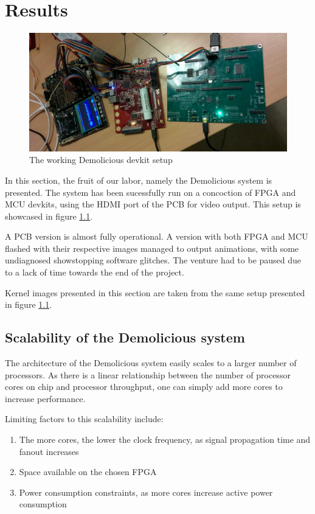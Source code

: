 \documentclass[../main/report.tex]{subfiles}
\begin{document}
\chapter{Results}

\begin{figure}[H]
	\centering
	\includegraphics[width=\textwidth]{../results/diagrams/frankenlicious.jpeg}
	\caption{The working Demolicious devkit setup}
	\label{fig:frankenlicious}
\end{figure}

In this section, the fruit of our labor, namely the Demolicious system is presented.
The system has been sucessfully run on a concoction of FPGA and MCU devkits, using the HDMI port of the PCB for video output.
This setup is showcased in figure \ref{fig:frankenlicious}.

A PCB version is almost fully operational.
A version with both FPGA and MCU flashed with their respective images managed to output animations, with some undiagnosed showstopping software glitches.
The venture had to be paused due to a lack of time towards the end of the project.

Kernel images presented in this section are taken from the same setup presented in figure \ref{fig:frankenlicious}.

\section{Scalability of the Demolicious system}
\label{sec:scalability}

The architecture of the Demolicious system easily scales to a larger number of processors.
As there is a linear relationship between the number of processor cores on chip and processor throughput, one can simply add more cores to increase performance.

Limiting factors to this scalability include:
\begin{enumerate}
  \item
    The more cores, the lower the clock frequency, as signal propagation time and fanout increases
  \item
    Space available on the chosen FPGA
  \item
    Power consumption constraints, as more cores increase active power consumption
\end{enumerate}
\end{document}
